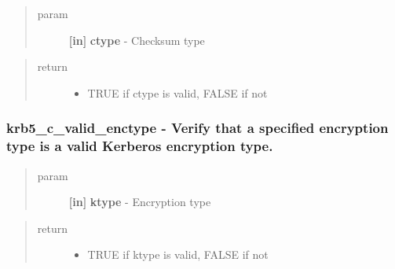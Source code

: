 \documentclass[letterpaper,10pt,english]{sphinxmanual}
\begin{document}
\begin{quote}\begin{description}
\item[{param}] \leavevmode
\textbf{{[}in{]}} \textbf{ctype} - Checksum type

\end{description}\end{quote}
\begin{quote}\begin{description}
\item[{return}] \leavevmode\begin{itemize}
\item {} 
TRUE if ctype is valid, FALSE if not

\end{itemize}

\end{description}\end{quote}


\subsubsection{krb5\_c\_valid\_enctype -  Verify that a specified encryption type is a valid Kerberos encryption type.}
\label{appdev/refs/api/krb5_c_valid_enctype:krb5-c-valid-enctype-verify-that-a-specified-encryption-type-is-a-valid-kerberos-encryption-type}\label{appdev/refs/api/krb5_c_valid_enctype::doc}

\begin{fulllineitems}
\label{appdev/refs/api/krb5_c_valid_enctype:krb5_c_valid_enctype}
\end{fulllineitems}

\begin{quote}\begin{description}
\item[{param}] \leavevmode
\textbf{{[}in{]}} \textbf{ktype} - Encryption type

\end{description}\end{quote}
\begin{quote}\begin{description}
\item[{return}] \leavevmode\begin{itemize}
\item {} 
TRUE if ktype is valid, FALSE if not

\end{itemize}

\end{description}\end{quote}
\end{document}
